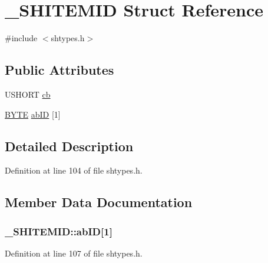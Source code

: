 \hypertarget{struct___s_h_i_t_e_m_i_d}{}\section{\+\_\+\+S\+H\+I\+T\+E\+M\+ID Struct Reference}
\label{struct___s_h_i_t_e_m_i_d}


{\ttfamily \#include $<$shtypes.\+h$>$}

\subsection*{Public Attributes}
\begin{DoxyCompactItemize}
\item 
U\+S\+H\+O\+RT \hyperlink{struct___s_h_i_t_e_m_i_d_a6c450a3b68d79c1af54a2c489b57ebcb}{cb}
\item 
\hyperlink{mapinls_8h_a4ae1dab0fb4b072a66584546209e7d58}{B\+Y\+TE} \hyperlink{struct___s_h_i_t_e_m_i_d_ae0e09d9fb4ef7430529e22a1187c4e77}{ab\+ID} \mbox{[}1\mbox{]}
\end{DoxyCompactItemize}


\subsection{Detailed Description}


Definition at line 104 of file shtypes.\+h.



\subsection{Member Data Documentation}
\subsubsection[{\texorpdfstring{ab\+ID}{abID}}]{ \+\_\+\+S\+H\+I\+T\+E\+M\+I\+D\+::ab\+ID\mbox{[}1\mbox{]}}\hypertarget{struct___s_h_i_t_e_m_i_d_ae0e09d9fb4ef7430529e22a1187c4e77}{}\label{struct___s_h_i_t_e_m_i_d_ae0e09d9fb4ef7430529e22a1187c4e77}


Definition at line 107 of file shtypes.\+h.

